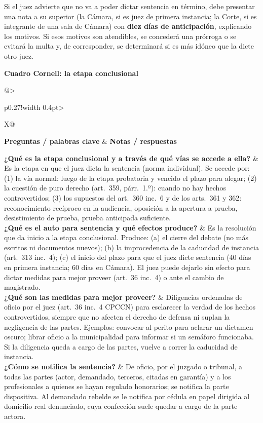 \documentclass[12pt,oneside]{book}
\makeatletter
\newcommand{\cornelltitle}[1]{\par\bigskip\noindent\textbf{\sffamily Cuadro Cornell: #1}\par\nopagebreak\smallskip}
\newcommand{\cqrow}[2]{\textbf{#1} & #2 \\[0.5em]}
\newcommand{\cornellblock}[1]{%
  \noindent\begin{tabularx}{\textwidth}{@{}>{\raggedright\arraybackslash}p{0.27\textwidth}!{\vrule width 0.4pt}>{\raggedright\arraybackslash}X@{}}
  \toprule
  \textbf{Preguntas / palabras clave} & \textbf{Notas / respuestas} \\
  \midrule
  #1
  \bottomrule
  \end{tabularx}\par}
\makeatother
\begin{document}
Si el juez advierte que no va a poder dictar sentencia en término, debe presentar una nota a su superior (la Cámara, si es juez de primera instancia; la Corte, si es integrante de una sala de Cámara) con \textbf{diez días de anticipación}, explicando los motivos. Si esos motivos son atendibles, se concederá una prórroga o se evitará la multa y, de corresponder, se determinará si es más idóneo que la dicte otro juez.

\cornelltitle{la etapa conclusional}
\cornellblock{
\cqrow{¿Qué es la etapa conclusional y a través de qué vías se accede a ella?}{Es la etapa en que el juez dicta la sentencia (norma individual). Se accede por: (1) la vía normal: luego de la etapa probatoria y vencido el plazo para alegar; (2) la cuestión de puro derecho (art.~359, párr.~1.º): cuando no hay hechos controvertidos; (3) los supuestos del art.~360 inc.~6 y de los arts.~361 y 362: reconocimiento recíproco en la audiencia, oposición a la apertura a prueba, desistimiento de prueba, prueba anticipada suficiente.
}
\cqrow{¿Qué es el auto para sentencia y qué efectos produce?}{Es la resolución que da inicio a la etapa conclusional. Produce: (a) el cierre del debate (no más escritos ni documentos nuevos); (b) la improcedencia de la caducidad de instancia (art.~313 inc.~4); (c) el inicio del plazo para que el juez dicte sentencia (40 días en primera instancia; 60 días en Cámara). El juez puede dejarlo sin efecto para dictar medidas para mejor proveer (art.~36 inc.~4) o ante el cambio de magistrado.
}
\cqrow{¿Qué son las medidas para mejor proveer?}{Diligencias ordenadas de oficio por el juez (art.~36 inc.~4 CPCCN) para esclarecer la verdad de los hechos controvertidos, siempre que no afecten el derecho de defensa ni suplan la negligencia de las partes. Ejemplos: convocar al perito para aclarar un dictamen oscuro; librar oficio a la municipalidad para informar si un semáforo funcionaba. Si la diligencia queda a cargo de las partes, vuelve a correr la caducidad de instancia.
}
\cqrow{¿Cómo se notifica la sentencia?}{De oficio, por el juzgado o tribunal, a todas las partes (actor, demandado, terceros, citadas en garantía) y a los profesionales a quienes se hayan regulado honorarios; se notifica la parte dispositiva. Al demandado rebelde se le notifica por cédula en papel dirigida al domicilio real denunciado, cuya confección suele quedar a cargo de la parte actora.
}
}
\medskip
\end{document}
